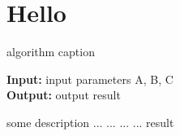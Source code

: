 \documentclass[journal,article,submit,moreauthors,pdftex,10pt,a4paper]{Definitions/mdpi}
\begin{document}

\section{Hello}
\begin{algorithm}[t]
	\caption{algorithm caption} 
	\hspace*{0.02in} {\bf Input:} 
	input parameters A, B, C\\
	\hspace*{0.02in} {\bf Output:} 
	output result
	\begin{algorithmic}[1]
		\State some description 
		\State ...
		\State ...
		\Else
		\State ...
		\EndIf
		\EndFor
		\State ...
		\EndWhile
		\State \Return result
	\end{algorithmic}
\end{algorithm}
	
\end{document}
